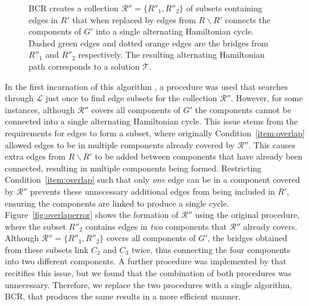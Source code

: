 \documentclass[authoryear]{elsarticle}
\begin{document}
\begin{figure}[H]	
	\centering
	\begin{subfigure}[h]{0.35\textwidth}
		
		\caption{}
		\label{fig:bcrlist}
	\end{subfigure} \hspace{7mm} %
	\begin{subfigure}[h]{0.25\textwidth}
		
		\caption{}
		\label{fig:mpsconnect}
	\end{subfigure} \hspace{7mm} %
	\begin{subfigure}[h]{0.25\textwidth}
		
		\caption{}
		\label{fig:mpscycle}
	\end{subfigure}
	\begin{subfigure}[h]{0.75\textwidth}
		
		\caption{}
		\label{fig:solutionpath}
	\end{subfigure}
	\caption{BCR creates a collection $\mathcal{R}'' = \{R''_1, R''_2\}$ of subsets containing edges in $R'$ that when replaced by edges from $R\backslash R'$ connects the components of $G'$ into a single alternating Hamiltonian cycle. Dashed green edges and dotted orange edges are the bridges from $R''_1$ and $R''_2$ respectively. The resulting alternating Hamiltonian path corresponds to a solution $\mathcal{T}$.}
	\label{fig:bcr}
\end{figure}

\noindent In the first incarnation of this algorithm \citep{becker2010}, a procedure was used that searches through $\mathcal{L}$ just once to find edge subsets for the collection $\mathcal{R}''$. However, for some instances, although $\mathcal{R}''$ covers all components of $G'$ the components cannot be connected into a single alternating Hamiltonian cycle. This issue stems from the requirements for edges to form a subset, where originally Condition~\ref{item:overlap} allowed edges to be in multiple components already covered by $\mathcal{R}''$. This causes extra edges from $R \backslash R'$ to be added between components that have already been connected, resulting in multiple components being formed. Restricting Condition~\ref{item:overlap} such that only \emph{one} edge can be in a component covered by $\mathcal{R}''$ prevents these unnecessary additional edges from being included in $R'$, ensuring the components are linked to produce a single cycle. Figure~\ref{fig:overlaperror} shows the formation of $\mathcal{R}''$ using the original procedure, where the subset $R''_2$ contains edges in \emph{two} components that $\mathcal{R}''$ already covers. Although $\mathcal{R}'' = \{R''_1, R''_2\}$ covers all components of $G'$, the bridges obtained from these subsets link $C_2$ and $C_3$ twice, thus connecting the four components into two different components. A further procedure was implemented by \citet{hawa2018} that recitifies this issue, but we found that the combination of both procedures was unnecessary. Therefore, we replace the two procedures with a single algorithm, BCR, that produces the same results in a more efficient manner.
\end{document}

